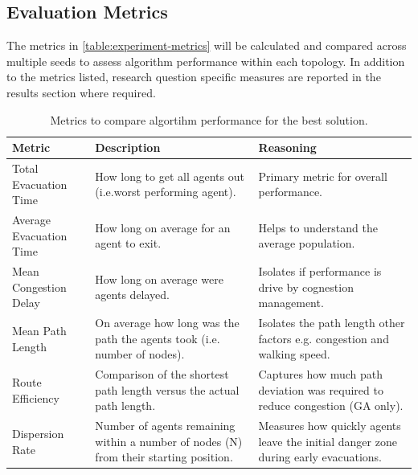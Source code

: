 \documentclass[12pt,a4paper]{report}
\begin{document}
\subsection{Evaluation Metrics}
The metrics in \autoref{table:experiment-metrics} will be calculated and compared across multiple seeds to assess algorithm performance within each topology. In addition to the metrics listed, research question specific measures are reported in the results section where required.

\begin{table}[htb]
  \bigskip
  \begin{center}
    \begin{tabular}{| p{3.5cm} | p{5.5cm} | p{5.5cm} |}
      \hline
      Metric & Description & Reasoning \\
      \hline
      \hline
      Total Evacuation Time & How long to get all agents out (i.e.worst performing agent). & Primary metric for overall performance. \\

      Average Evacuation Time & How long on average for an agent to exit. & Helps to understand the average population. \\

      Mean Congestion Delay & How long on average were agents delayed. & Isolates if performance is drive by cognestion management. \\

      Mean Path Length & On average how long was the path the agents took (i.e. number of nodes). & Isolates the path length other factors e.g. congestion and walking speed. \\

      Route Efficiency & Comparison of the shortest path length versus the actual path length. & Captures how much path deviation was required to reduce congestion (GA only). \\

      Dispersion Rate & Number of agents remaining within a number of nodes (N) from their starting position. & Measures how quickly agents leave the initial danger zone during early evacuations. \\

      \hline
    \end{tabular}
  \end{center}
\caption[Algorithm comparison metrics]{Metrics to compare algortihm performance for the best solution.}
\label{table:experiment-metrics}
\end{table}
\end{document}
